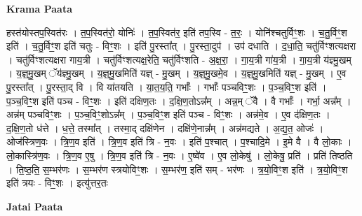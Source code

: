 \documentclass[17pt]{extarticle}
\begin{document}
\textbf{Krama Paata} \newline

हस्त॑योस्तप॒स्वित॑रः । त॒प॒स्वित॑रो॒ योनिः॑ । त॒प॒स्वित॑र॒ इति॑ तप॒स्वि - त॒रः॒ । योनि॑श्चतुर्विꣳ॒॒शः । च॒तु॒र्विꣳ॒॒श इति॑ । च॒तु॒र्विꣳ॒॒श इति॑ चतुः - विꣳ॒॒शः । इति॑ पु॒रस्ता᳚त् । पु॒रस्ता॒दुप॑ । उप॑ दधाति । द॒धा॒ति॒ चतु॑र्विꣳशत्यक्षरा । चतु॑र्विꣳशत्यक्षरा गाय॒त्री । चतु॑र्विꣳशत्यक्ष॒रेति॒ चतु॑र्विꣳशति - अ॒क्ष॒रा॒ । गा॒य॒त्री गा॑य॒त्री । गा॒य॒त्री य॑ज्ञ्मु॒खम् । य॒ज्ञ्॒मु॒खम् ॅय॑ज्ञ्मु॒खम् । य॒ज्ञ्॒मु॒खमिति॑ यज्ञ् - मु॒खम् । य॒ज्ञ्॒मु॒खमे॒व । य॒ज्ञ्॒मु॒खमिति॑ यज्ञ् - मु॒खम् । ए॒व पु॒रस्ता᳚त् । पु॒रस्ता॒द् वि । वि या॑तयति । या॒त॒य॒ति॒ गर्भाः᳚ । गर्भाः᳚ पञ्चविꣳ॒॒शः । प॒ञ्च॒विꣳ॒॒श इति॑ । प॒ञ्च॒विꣳ॒॒श इति॑ पञ्च - विꣳ॒॒शः । इति॑ दक्षिण॒तः । द॒क्षि॒ण॒तोऽन्न᳚म् । अन्न॒म् ॅवै । वै गर्भाः᳚ । गर्भा॒ अन्न᳚म् । अन्न॑म् पञ्चविꣳ॒॒शः । प॒ञ्च॒विꣳ॒॒शोऽन्न᳚म् । प॒ञ्च॒विꣳ॒॒श इति॑ पञ्च - विꣳ॒॒शः । अन्न॑मे॒व । ए॒व द॑क्षिण॒तः । द॒क्षि॒ण॒तो ध॑त्ते । ध॒त्ते॒ तस्मा᳚त् । तस्मा॒द् दक्षि॑णेन । दक्षि॑णे॒नान्न᳚म् । अन्न॑मद्यते । अ॒द्य॒त॒ ओजः॑ । ओज॑स्त्रिण॒वः । त्रि॒ण॒व इति॑ । त्रि॒ण॒व इति॑ त्रि - न॒वः । इति॑ प॒श्चात् । प॒श्चादि॒मे । इ॒मे वै । वै लो॒काः । लो॒कास्त्रि॑ण॒वः । त्रि॒ण॒व ए॒षु । त्रि॒ण॒व इति॑ त्रि - न॒वः । ए॒ष्वे॑व । ए॒व लो॒केषु॑ । लो॒केषु॒ प्रति॑ । प्रति॑ तिष्ठति । ति॒ष्ठ॒ति॒ स॒म्भर॑णः । स॒म्भर॑ण स्त्रयोविꣳ॒॒शः । स॒म्भर॑ण॒ इति॑ सम् - भर॑णः । त्र॒यो॒विꣳ॒॒श इति॑ । त्र॒यो॒विꣳ॒॒श इति॑ त्रयः - विꣳ॒॒शः । इत्यु॑त्तर॒तः \newline

\textbf{Jatai Paata} \newline
\end{document}
